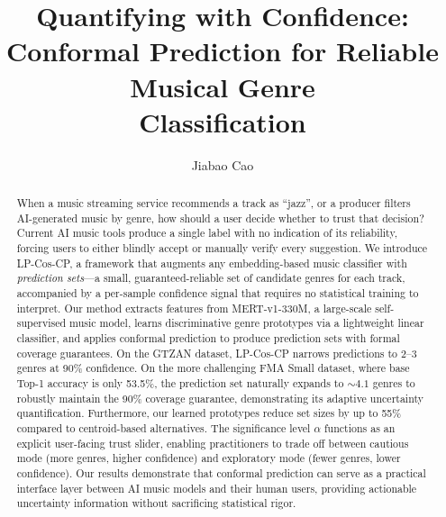 \documentclass[runningheads, a4paper]{llncs}
\title{Quantifying with Confidence:\\
       Conformal Prediction for Reliable Musical Genre\\
       Classification}
\author{Jiabao Cao\inst{1}\orcidID{0009-0006-2362-5099}}
\institute{University of Nottingham Ningbo China, Ningbo, China\\
\email{scyjc20@nottingham.edu.cn}}
\begin{document}
\maketitle

\begin{abstract}
When a music streaming service recommends a track as ``jazz'', or a producer
filters AI-generated music by genre, how should a user decide whether to trust
that decision? Current AI music tools produce a single label with no indication
of its reliability, forcing users to either blindly accept or manually verify
every suggestion. We introduce LP-Cos-CP, a framework that augments any
embedding-based music classifier with \emph{prediction sets}---a small,
guaranteed-reliable set of candidate genres for each track, accompanied by a
per-sample confidence signal that requires no statistical training to interpret.
Our method extracts features from MERT-v1-330M, a large-scale self-supervised
music model, learns discriminative genre prototypes via a lightweight linear
classifier, and applies conformal prediction to produce prediction sets with
formal coverage guarantees.
On the GTZAN dataset, LP-Cos-CP narrows predictions to 2--3 genres at 90\% confidence.
On the more challenging FMA Small dataset, where base Top-1 accuracy is only 53.5\%, the prediction set naturally expands to ${\sim}4.1$ genres to robustly maintain the 90\% coverage guarantee, demonstrating its adaptive uncertainty quantification.
Furthermore, our learned prototypes reduce set sizes by up to 55\% compared to centroid-based alternatives.
The significance level $\alpha$ functions as an explicit user-facing trust slider, enabling practitioners to
trade off between cautious mode (more genres, higher confidence) and
exploratory mode (fewer genres, lower confidence). Our results demonstrate that
conformal prediction can serve as a practical interface layer between AI music
models and their human users, providing actionable uncertainty information
without sacrificing statistical rigor.

\end{abstract}









\end{document}

